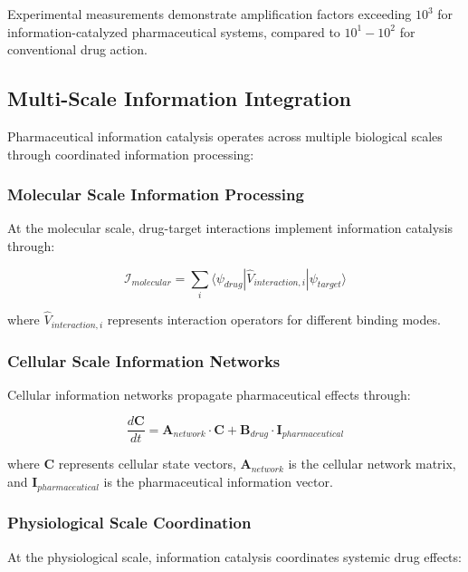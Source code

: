 Experimental measurements demonstrate amplification factors exceeding $10^3$ for information-catalyzed pharmaceutical systems, compared to $10^1-10^2$ for conventional drug action.

\subsection{Multi-Scale Information Integration}

Pharmaceutical information catalysis operates across multiple biological scales through coordinated information processing:

\subsubsection{Molecular Scale Information Processing}

At the molecular scale, drug-target interactions implement information catalysis through:

\begin{equation}
\mathcal{I}_{molecular} = \sum_{i} \langle \psi_{drug} | \hat{V}_{interaction,i} | \psi_{target} \rangle
\end{equation}

where $\hat{V}_{interaction,i}$ represents interaction operators for different binding modes.

\subsubsection{Cellular Scale Information Networks}

Cellular information networks propagate pharmaceutical effects through:

\begin{equation}
\frac{d\mathbf{C}}{dt} = \mathbf{A}_{network} \cdot \mathbf{C} + \mathbf{B}_{drug} \cdot \mathbf{I}_{pharmaceutical}
\end{equation}

where $\mathbf{C}$ represents cellular state vectors, $\mathbf{A}_{network}$ is the cellular network matrix, and $\mathbf{I}_{pharmaceutical}$ is the pharmaceutical information vector.

\subsubsection{Physiological Scale Coordination}

At the physiological scale, information catalysis coordinates systemic drug effects:

